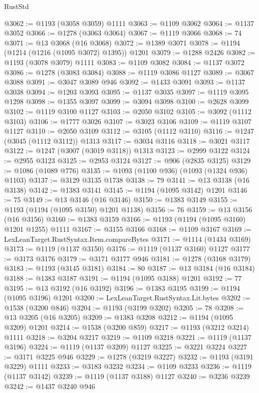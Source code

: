 \begin{lexlean}{RustStd}
\begin{coremodule}
@3062 := @1193 (@3058 @3059) @1111
@3063 := @1109 @3062
@3064 := @1137 @3052
@3066 := @1278 (@3063 @3064)
@3067 := @1119 @3066
@3068 := 74
@3071 := @13 @3068 (@16 @3068)
@3072 := @1389 @3071
@3078 := @1194 (@1214 (@1216 (@1095 @3072) @1395)) @1201
@3079 := @1288 @2426
@3082 := @1193 (@3078 @3079) @1111
@3083 := @1109 @3082
@3084 := @1137 @3072
@3086 := @1278 (@3083 @3084)
@3088 := @1119 @3086 @1127
@3089 := @3067 @3088
@3091 := @3047 @3089 @946
@3092 := @1433 @3091
@3093 := @1137 @3038
@3094 := @1203 @3093
@3095 := @1137 @3035
@3097 := @1119 @3095 @1298
@3098 := @1355 @3097
@3099 := @3094 @3098
@3100 := @2628 @3099
@3102 := @1119 @3100 @1127
@3103 := @2050 @3102
@3105 := @3092 (@1112 @3103)
@3106 := @1777 @3026
@3107 := @3023 @3106
@3109 := @1119 @3107 @1127
@3110 := @2050 @3109
@3112 := @3105 (@1112 @3110)
@3116 := @1247 (@3045 (@1112 @3112)) @1313
@3117 := @3034 @3116
@3118 := @3021 @3117
@3122 := @1247 (@3007 (@3019 @3118)) @1313
@3123 := @2999 @3122
@3124 := @2955 @3123
@3125 := @2953 @3124
@3127 := @906 (@2835 @3125)
@3129 := @1086 (@1089 @776)
@3135 := @1093 (@1100 @936) (@1093 (@1324 @936) @1103)
@3137 := @3129 @3135 @1738
@3138 := 79
@3141 := @13 @3138 (@16 @3138)
@3142 := @1383 @3141
@3145 := @1194 (@1095 @3142) @1201
@3146 := 75
@3149 := @13 @3146 (@16 @3146)
@3150 := @1383 @3149
@3155 := @1193 (@1194 (@1095 @3150) @1201 @1138)
@3156 := 76
@3159 := @13 @3156 (@16 @3156)
@3160 := @1383 @3159
@3166 := @1193 (@1194 (@1095 @3160) @1201 @1255) @1111
@3167 := @3155 @3166
@3168 := @1109 @3167
@3169 := LexLeanTarget.RustSyntax.Item.compareBytes
@3171 := @1114 (@1434 @3169)
@3173 := @1119 (@1137 @3150)
@3176 := @1119 (@1137 @3160) @1127
@3177 := @3173 @3176
@3179 := @3171 @3177 @946
@3181 := @1278 (@3168 @3179)
@3183 := @1193 (@3145 @3181)
@3184 := 80
@3187 := @13 @3184 (@16 @3184)
@3188 := @1383 @3187
@3191 := @1194 (@1095 @3188) @1201
@3192 := 77
@3195 := @13 @3192 (@16 @3192)
@3196 := @1383 @3195
@3199 := @1194 (@1095 @3196) @1201
@3200 := LexLeanTarget.RustSyntax.Lit.bytes
@3202 := @1538 (@3200 @846)
@3204 := @1193 (@3199 @3202)
@3205 := 78
@3208 := @13 @3205 (@16 @3205)
@3209 := @1383 @3208
@3212 := @1194 (@1095 @3209) @1201
@3214 := @1538 (@3200 @859)
@3217 := @1193 (@3212 @3214) @1111
@3218 := @3204 @3217
@3219 := @1109 @3218
@3221 := @1119 (@1137 @3196)
@3224 := @1119 (@1137 @3209) @1127
@3225 := @3221 @3224
@3227 := @3171 @3225 @946
@3229 := @1278 (@3219 @3227)
@3232 := @1193 (@3191 @3229) @1111
@3233 := @3183 @3232
@3234 := @1109 @3233
@3236 := @1119 (@1137 @3142)
@3239 := @1119 (@1137 @3188) @1127
@3240 := @3236 @3239
@3242 := @1437 @3240 @946

\end{coremodule}
\end{lexlean}
